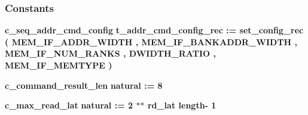 \subsubsection*{Constants}
 \begin{DoxyCompactItemize}
\item 
{\bf c\+\_\+seq\+\_\+addr\+\_\+cmd\+\_\+config} {\bfseries {\bfseries {\bf t\+\_\+addr\+\_\+cmd\+\_\+config\+\_\+rec}} \textcolor{vhdlchar}{ }\textcolor{vhdlchar}{ }\textcolor{vhdlchar}{\+:}\textcolor{vhdlchar}{=}\textcolor{vhdlchar}{ }\textcolor{vhdlchar}{ }\textcolor{vhdlchar}{ }\textcolor{vhdlchar}{ }\textcolor{vhdlchar}{set\+\_\+config\+\_\+rec}\textcolor{vhdlchar}{ }\textcolor{vhdlchar}{(}\textcolor{vhdlchar}{ }\textcolor{vhdlchar}{ }\textcolor{vhdlchar}{ }\textcolor{vhdlchar}{ }{\bfseries {\bf M\+E\+M\+\_\+\+I\+F\+\_\+\+A\+D\+D\+R\+\_\+\+W\+I\+D\+TH}} \textcolor{vhdlchar}{ }\textcolor{vhdlchar}{,}\textcolor{vhdlchar}{ }\textcolor{vhdlchar}{ }\textcolor{vhdlchar}{ }\textcolor{vhdlchar}{ }{\bfseries {\bf M\+E\+M\+\_\+\+I\+F\+\_\+\+B\+A\+N\+K\+A\+D\+D\+R\+\_\+\+W\+I\+D\+TH}} \textcolor{vhdlchar}{ }\textcolor{vhdlchar}{,}\textcolor{vhdlchar}{ }\textcolor{vhdlchar}{ }\textcolor{vhdlchar}{ }\textcolor{vhdlchar}{ }{\bfseries {\bf M\+E\+M\+\_\+\+I\+F\+\_\+\+N\+U\+M\+\_\+\+R\+A\+N\+KS}} \textcolor{vhdlchar}{ }\textcolor{vhdlchar}{,}\textcolor{vhdlchar}{ }\textcolor{vhdlchar}{ }\textcolor{vhdlchar}{ }\textcolor{vhdlchar}{ }{\bfseries {\bf D\+W\+I\+D\+T\+H\+\_\+\+R\+A\+T\+IO}} \textcolor{vhdlchar}{ }\textcolor{vhdlchar}{,}\textcolor{vhdlchar}{ }\textcolor{vhdlchar}{ }\textcolor{vhdlchar}{ }\textcolor{vhdlchar}{ }{\bfseries {\bf M\+E\+M\+\_\+\+I\+F\+\_\+\+M\+E\+M\+T\+Y\+PE}} \textcolor{vhdlchar}{ }\textcolor{vhdlchar}{)}\textcolor{vhdlchar}{ }} 
\item 
{\bf c\+\_\+command\+\_\+result\+\_\+len} {\bfseries \textcolor{comment}{natural}\textcolor{vhdlchar}{ }\textcolor{vhdlchar}{ }\textcolor{vhdlchar}{\+:}\textcolor{vhdlchar}{=}\textcolor{vhdlchar}{ }\textcolor{vhdlchar}{ } \textcolor{vhdldigit}{8} \textcolor{vhdlchar}{ }} 
\item 
{\bf c\+\_\+max\+\_\+read\+\_\+lat} {\bfseries \textcolor{comment}{natural}\textcolor{vhdlchar}{ }\textcolor{vhdlchar}{ }\textcolor{vhdlchar}{\+:}\textcolor{vhdlchar}{=}\textcolor{vhdlchar}{ }\textcolor{vhdlchar}{ } \textcolor{vhdldigit}{2} \textcolor{vhdlchar}{$\ast$}\textcolor{vhdlchar}{$\ast$}\textcolor{vhdlchar}{ }\textcolor{vhdlchar}{ }\textcolor{vhdlchar}{ }{\bfseries {\bf rd\+\_\+lat}} \textcolor{vhdlchar}{ }\textcolor{vhdlchar}{\textquotesingle{}}\textcolor{vhdlchar}{ }\textcolor{vhdlkeyword}{length}\textcolor{vhdlchar}{-\/}\textcolor{vhdlchar}{ } \textcolor{vhdldigit}{1} \textcolor{vhdlchar}{ }} 

\end{DoxyCompactItemize}
